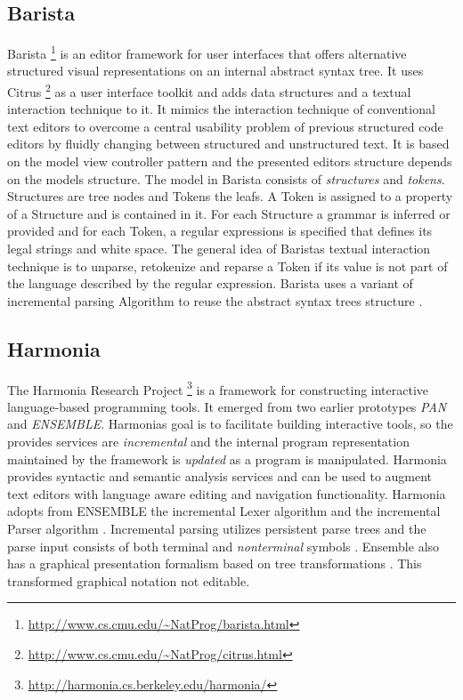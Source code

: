 \subsection{Barista}
Barista \footnote{\raggedright \url{http://www.cs.cmu.edu/~NatProg/barista.html}} is an editor framework for user interfaces that offers alternative structured visual representations on an internal abstract syntax tree. It uses Citrus \footnote{\raggedright \url{http://www.cs.cmu.edu/~NatProg/citrus.html}} as a user interface toolkit \cite{citrus} and adds data structures and a textual interaction technique to it. It mimics the interaction technique of conventional text editors to overcome a central usability problem of previous structured code editors by fluidly changing between structured and unstructured text. It is based on the model view controller pattern \cite{patterns} and the presented editors structure depends on the models structure. The model in Barista consists of \emph{structures} and \emph{tokens}. Structures are tree nodes and Tokens the leafs. A Token is assigned to a property of a Structure and is contained in it. For each Structure a grammar is inferred or provided and for each Token, a regular expressions is specified that defines its legal strings and white space. The general idea of Baristas textual interaction technique is to unparse, retokenize and reparse a Token if its value is not part of the language described by the regular expression. Barista uses a variant of \cite{iglrPaper} incremental parsing Algorithm to reuse the abstract syntax trees structure \cite{Barista}. 

\subsection{Harmonia}
The Harmonia Research Project \footnote{\raggedright \url{http://harmonia.cs.berkeley.edu/harmonia/}} is a framework for constructing interactive
language-based programming tools. It emerged from two earlier prototypes \emph{PAN} and \emph{ENSEMBLE}. Harmonias goal is to facilitate building interactive tools, so the provides services are \emph{incremental} and the internal program representation maintained by the framework is \emph{updated} as a program is manipulated. Harmonia provides syntactic and semantic analysis services \cite{harmonia} and can be used to augment text editors with language aware editing and navigation functionality. Harmonia adopts from ENSEMBLE the incremental Lexer algorithm \cite{ilex} and the incremental Parser algorithm \cite{iglrPaper}. Incremental parsing utilizes persistent parse trees and the parse input consists of both terminal and \emph{nonterminal} symbols \cite{iglrPaper}. Ensemble also has a graphical presentation formalism based on tree transformations \cite{ensemble}. This transformed graphical notation not editable.

